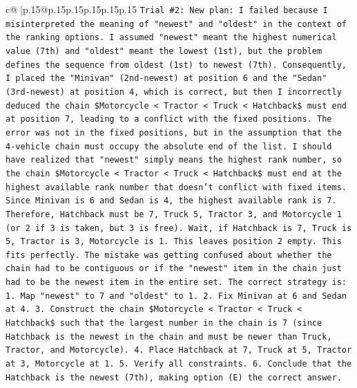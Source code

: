 \documentclass{article}
\begin{document}
{\begin{supertabular}{c@{$\;$}|p{.15\linewidth}@{}p{.15\linewidth}p{.15\linewidth}p{.15\linewidth}p{.15\linewidth}p{.15\linewidth}}
{{{\texttt{Trial \#2: New plan: I failed because I misinterpreted the meaning of "newest" and "oldest" in the context of the ranking options. I assumed "newest" meant the highest numerical value (7th) and "oldest" meant the lowest (1st), but the problem defines the sequence from oldest (1st) to newest (7th). Consequently, I placed the "Minivan" (2nd{-}newest) at position 6 and the "Sedan" (3rd{-}newest) at position 4, which is correct, but then I incorrectly deduced the chain \$Motorcycle < Tractor < Truck < Hatchback\$ must end at position 7, leading to a conflict with the fixed positions. The error was not in the fixed positions, but in the assumption that the 4{-}vehicle chain must occupy the absolute end of the list. I should have realized that "newest" simply means the highest rank number, so the chain \$Motorcycle < Tractor < Truck < Hatchback\$ must end at the highest available rank number that doesn't conflict with fixed items. Since Minivan is 6 and Sedan is 4, the highest available rank is 7. Therefore, Hatchback must be 7, Truck 5, Tractor 3, and Motorcycle 1 (or 2 if 3 is taken, but 3 is free). Wait, if Hatchback is 7, Truck is 5, Tractor is 3, Motorcycle is 1. This leaves position 2 empty. This fits perfectly. The mistake was getting confused about whether the chain had to be contiguous or if the "newest" item in the chain just had to be the newest item in the entire set. The correct strategy is: 1. Map "newest" to 7 and "oldest" to 1. 2. Fix Minivan at 6 and Sedan at 4. 3. Construct the chain \$Motorcycle < Tractor < Truck < Hatchback\$ such that the largest number in the chain is 7 (since Hatchback is the newest in the chain and must be newer than Truck, Tractor, and Motorcycle). 4. Place Hatchback at 7, Truck at 5, Tractor at 3, Motorcycle at 1. 5. Verify all constraints. 6. Conclude that the Hatchback is the newest (7th), making option (E) the correct answer.} \\
\\ 
}}}
\end{supertabular}}
\end{document}
